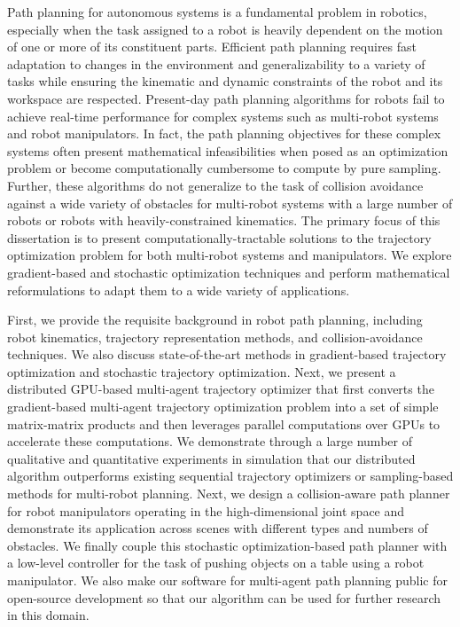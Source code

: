 Path planning for autonomous systems is a fundamental problem in robotics, especially when the task assigned to a robot is heavily dependent on the motion of one or more of its constituent parts. Efficient path planning requires fast adaptation to changes in the environment and generalizability to a variety of tasks while ensuring the kinematic and dynamic constraints of the robot and its workspace are respected. Present-day path planning algorithms for robots fail to achieve real-time performance for complex systems such as multi-robot systems and robot manipulators. In fact, the path planning objectives for these complex systems often present mathematical infeasibilities when posed as an optimization problem or become computationally cumbersome to compute by pure sampling. Further, these algorithms do not generalize to the task of collision avoidance against a wide variety of obstacles for multi-robot systems with a large number of robots or robots with heavily-constrained kinematics. The primary focus of this dissertation is to present computationally-tractable solutions to the trajectory optimization problem for both multi-robot systems and manipulators. We explore gradient-based and stochastic optimization techniques and perform mathematical reformulations to adapt them to a wide variety of applications.

First, we provide the requisite background in robot path planning, including robot kinematics, trajectory representation methods, and collision-avoidance techniques. We also discuss state-of-the-art methods in gradient-based trajectory optimization and stochastic trajectory optimization. Next, we present a distributed GPU-based multi-agent trajectory optimizer that first converts the gradient-based multi-agent trajectory optimization problem into a set of simple matrix-matrix products and then leverages parallel computations over GPUs to accelerate these computations. We demonstrate through a large number of qualitative and quantitative experiments in simulation that our distributed algorithm outperforms existing sequential trajectory optimizers or sampling-based methods for multi-robot planning. Next, we design a collision-aware path planner for robot manipulators operating in the high-dimensional joint space and demonstrate its application across scenes with different types and numbers of obstacles. We finally couple this stochastic optimization-based path planner with a low-level controller for the task of pushing objects on a table using a robot manipulator. We also make our software for multi-agent path planning public for open-source development so that our algorithm can be used for further research in this domain.

